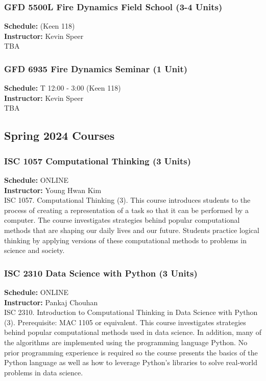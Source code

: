 \documentclass[12pt,a4paper]{article}
\begin{document}
\subsubsection*{GFD 5500L Fire Dynamics Field School (3-4 Units)}
\textbf{Schedule:} (Keen 118) \\
\textbf{Instructor:} Kevin Speer \\
TBA

\subsubsection*{GFD 6935 Fire Dynamics Seminar (1 Unit)}
\textbf{Schedule:} T 12:00 - 3:00 (Keen 118) \\
\textbf{Instructor:} Kevin Speer \\
TBA
\newpage

\subsection{Spring 2024 Courses}
\subsubsection*{ISC 1057 Computational Thinking (3 Units)}
\textbf{Schedule:} ONLINE \\
\textbf{Instructor:} Young Hwan Kim \\
ISC 1057. Computational Thinking (3). This course introduces students to the process of creating a representation of a task so that it can be performed by a computer. The course investigates strategies behind popular computational methods that are shaping our daily lives and our future. Students practice logical thinking by applying versions of these computational methods to problems in science and society.

\subsubsection*{ISC 2310 Data Science with Python (3 Units)}
\textbf{Schedule:} ONLINE \\
\textbf{Instructor:} Pankaj Chouhan \\
ISC 2310. Introduction to Computational Thinking in Data Science with Python (3). Prerequisite: MAC 1105 or equivalent. This course investigates strategies behind popular computational methods used in data science. In addition, many of the algorithms are implemented using the programming language Python. No prior programming experience is required so the course presents the basics of the Python language as well as how to leverage Python's libraries to solve real-world problems in data science.
\end{document}
